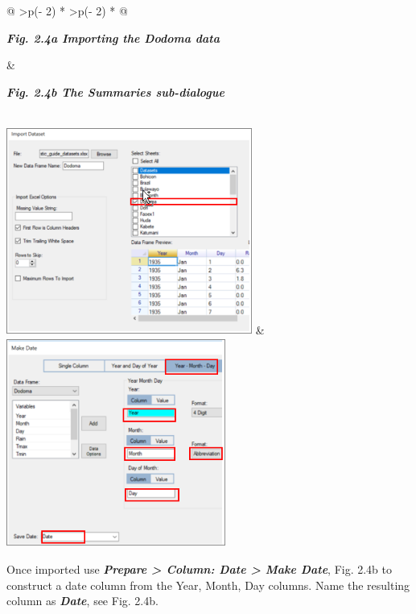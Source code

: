 \documentclass[
  letterpaper,
  DIV=11,
  numbers=noendperiod]{scrreprt}
\begin{document}
\begin{longtable}[]{@{}
  >{\centering\arraybackslash}p{(\columnwidth - 2\tabcolsep) * }
  >{\centering\arraybackslash}p{(\columnwidth - 2\tabcolsep) * }@{}}
\toprule\noalign{}
\begin{minipage}[b]{\linewidth}\centering
\textbf{\emph{Fig. 2.4a Importing the Dodoma data}}
\end{minipage} & \begin{minipage}[b]{\linewidth}\centering
\textbf{\emph{Fig. 2.4b The Summaries sub-dialogue}}
\end{minipage} \\
\midrule\noalign{}
\endhead
\bottomrule\noalign{}
\endlastfoot
\includegraphics[width=3.179in,height=2.681in]{figures/Fig2.4a.png} &
\includegraphics[width=2.83in,height=2.695in]{figures/Fig2.4b.png} \\
\end{longtable}

Once imported use \textbf{\emph{Prepare \textgreater{} Column: Date
\textgreater{} Make Date}}, Fig. 2.4b to construct a date column from
the Year, Month, Day columns. Name the resulting column as
\textbf{\emph{Date}}, see Fig. 2.4b.
\end{document}
